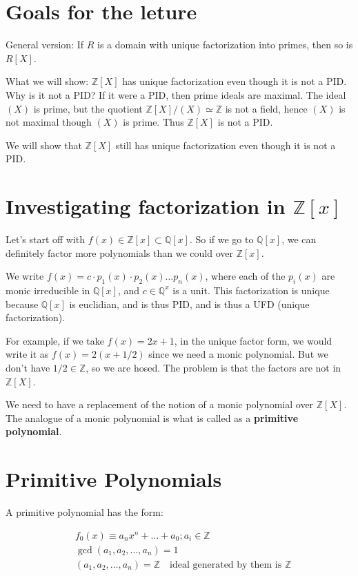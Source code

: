 \documentclass{book}
\newcommand{\Z}{\ensuremath{\mathbb{Z}}}
\newcommand{\Q}{\ensuremath{\mathbb{Q}}}
\theoremstyle{definition}
\begin{document}
\section{Goals for the leture}

General version: If $R$ is a domain with unique factorization into primes, then so is $R[X]$.

What we will show: $\Z[X]$ has unique factorization even though it is not a PID.
Why is it not a PID? If it were a PID, then prime ideals are maximal. The ideal $(X)$
is prime, but the quotient $\Z[X]/(X) \simeq \Z$ is not a field, hence $(X)$
is not maximal though $(X)$ is prime. Thus $\Z[X]$ is not a PID.

We will show that $\Z[X]$ still has unique factorization even though it is
not a PID.

\section{Investigating factorization in $\Z[x]$}

Let's start off with $f(x) \in \Z[x] \subset \Q[x]$. So if we go to $\Q[x]$,
we can definitely factor more polynomials than we could over $\Z[x]$.

We write $f(x) = c \cdot p_1(x) \cdot p_2(x) \dots p_n(x)$, where each
of the $p_i(x)$ are monic irreducible in $\Q[x]$, and $c \in \Q^x$ is a unit.
This factorization is unique because $\Q[x]$ is euclidian, and is thus
PID, and is thus a UFD (unique factorization).


For example, if we take $f(x) = 2x+1$, in the unique factor form, we would
write it as $f(x) = 2(x + 1/2)$ since we need a monic polynomial. But we
don't have $1/2 \in \Z$, so we are hosed. The problem is that the factors
are not in $\Z[X]$.

We need to have a replacement of the notion of a monic polynomial over $\Z[X]$.
The analogue of a monic polynomial is what is called as a \textbf{primitive polynomial}.

\section{Primitive Polynomials}
A primitive polynomial has the form:

\begin{align*}
&f_0(x) \equiv  a_n x^n + \dots + a_0 ; a_i \in \Z \\
&\gcd(a_1, a_2, \dots, a_n) = 1 \\
&(a_1, a_2, \dots, a_n) = \Z \quad \text{ideal generated by them is $\Z$}
\end{align*}
\end{document}

